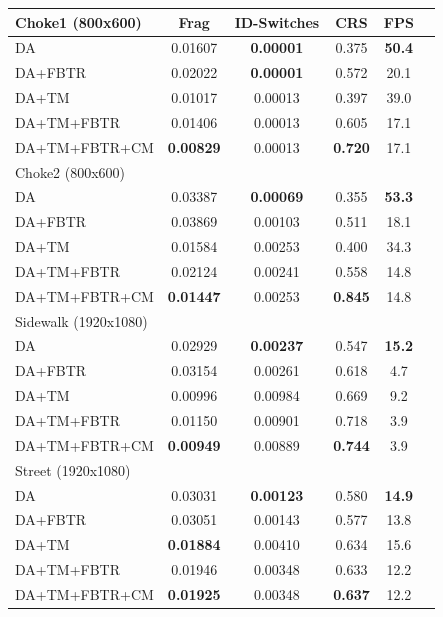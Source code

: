 \begin{table}[t]
    \centering
    \small
    \begin{tabular}{lccccc}
        \toprule
        Choke1 (800x600) & Frag & ID-Switches & CRS & FPS\\
        \midrule
        DA & 0.01607 & \textbf{0.00001} & 0.375 & \textbf{50.4}\\
        DA+FBTR & 0.02022 & \textbf{0.00001} & 0.572 & 20.1\\
        DA+TM & 0.01017 & 0.00013 & 0.397 & 39.0\\
        DA+TM+FBTR & 0.01406 & 0.00013 & 0.605 & 17.1\\
        DA+TM+FBTR+CM & \textbf{0.00829} & 0.00013 & \textbf{0.720} & 17.1\\
        \midrule
        
        Choke2 (800x600) & & & &\\
        \midrule
        DA & 0.03387 & \textbf{0.00069} & 0.355 & \textbf{53.3}\\
        DA+FBTR & 0.03869 & 0.00103 & 0.511 & 18.1\\
        DA+TM & 0.01584 & 0.00253 & 0.400 & 34.3\\
        DA+TM+FBTR & 0.02124 & 0.00241 & 0.558 & 14.8\\
        DA+TM+FBTR+CM & \textbf{0.01447} & 0.00253 & \textbf{0.845} & 14.8\\
        \midrule
        
        Sidewalk (1920x1080) & & & &\\
        \midrule
        DA & 0.02929 & \textbf{0.00237} & 0.547 & \textbf{15.2}\\
        DA+FBTR & 0.03154 & 0.00261 & 0.618 & 4.7\\
        DA+TM & 0.00996 & 0.00984 & 0.669 & 9.2\\
        DA+TM+FBTR & 0.01150 & 0.00901 & 0.718 & 3.9\\
        DA+TM+FBTR+CM & \textbf{0.00949} & 0.00889 & \textbf{0.744} & 3.9\\
        \midrule
        
        Street (1920x1080) & & & &\\
        \midrule
        DA & 0.03031 & \textbf{0.00123} & 0.580 & \textbf{14.9}\\
        DA+FBTR & 0.03051 & 0.00143 & 0.577 & 13.8\\
        DA+TM & \textbf{0.01884} & 0.00410 & 0.634 & 15.6\\
        DA+TM+FBTR & 0.01946 & 0.00348 & 0.633 & 12.2\\
        DA+TM+FBTR+CM & \textbf{0.01925} & 0.00348 & \textbf{0.637} & 12.2\\
        \midrule
        

\end{tabular}
\end{table}
